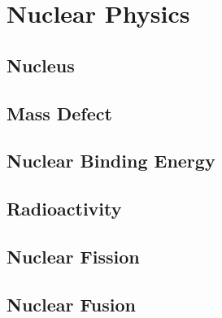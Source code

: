 \documentclass[
  12pt, %
  letterpaper,
]{LegrandOrangeBook}
\begin{document}
%
%




\chapter{Nuclear Physics}
\section{Nucleus}
\section{Mass Defect}
\section{Nuclear Binding Energy}
\section{Radioactivity}
\section{Nuclear Fission}
\section{Nuclear Fusion}
\end{document}
